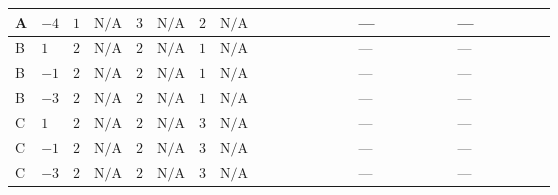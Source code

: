 \documentclass[8pt]{article}
\begin{document}
\begin{landscape}
\begin{longtable}{@{}llcccccc >{\raggedright\arraybackslash}p{0.21\linewidth} >{\raggedright\arraybackslash}p{0.21\linewidth} >{\raggedright\arraybackslash}p{0.21\linewidth}@{}}
\midrule
A & $-4$ & $1$ & $\text{N/A}$ & $3$ & $\text{N/A}$ & $2$ & $\text{N/A}$ & \scriptsize\adjustbox{max width=\linewidth}{$\begin{gathered} 4 {\lambda_5} \left({\lambda_5}\right)^{*}\end{gathered}$} & --- & --- \\
\midrule
B & $1$ & $2$ & $\text{N/A}$ & $2$ & $\text{N/A}$ & $1$ & $\text{N/A}$ & \scriptsize\adjustbox{max width=\linewidth}{$\begin{gathered} 3 {\lambda_5} \left({\lambda_5}\right)^{*}\end{gathered}$} & --- & --- \\
\midrule
B & $-1$ & $2$ & $\text{N/A}$ & $2$ & $\text{N/A}$ & $1$ & $\text{N/A}$ & \scriptsize\adjustbox{max width=\linewidth}{$\begin{gathered} +3 {\lambda_5} \left({\lambda_5}\right)^{*}\end{gathered}$} & --- & --- \\
\midrule
B & $-3$ & $2$ & $\text{N/A}$ & $2$ & $\text{N/A}$ & $1$ & $\text{N/A}$ & \scriptsize\adjustbox{max width=\linewidth}{$\begin{gathered} 3 {\lambda_5} \left({\lambda_5}\right)^{*}\end{gathered}$} & --- & --- \\
\midrule
C & $1$ & $2$ & $\text{N/A}$ & $2$ & $\text{N/A}$ & $3$ & $\text{N/A}$ & \scriptsize\adjustbox{max width=\linewidth}{$\begin{gathered} 3 {\lambda_5} \left({\lambda_5}\right)^{*}\end{gathered}$} & --- & --- \\
\midrule
C & $-1$ & $2$ & $\text{N/A}$ & $2$ & $\text{N/A}$ & $3$ & $\text{N/A}$ & \scriptsize\adjustbox{max width=\linewidth}{$\begin{gathered} +3 {\lambda_5} \left({\lambda_5}\right)^{*}\end{gathered}$} & --- & --- \\
\midrule
C & $-3$ & $2$ & $\text{N/A}$ & $2$ & $\text{N/A}$ & $3$ & $\text{N/A}$ & \scriptsize\adjustbox{max width=\linewidth}{$\begin{gathered} 3 {\lambda_5} \left({\lambda_5}\right)^{*}\end{gathered}$} & --- & --- \\
\midrule

\end{longtable}
\end{landscape}
\end{document}

